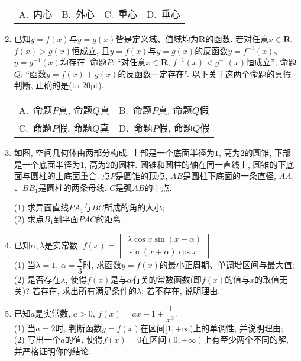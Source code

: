 \documentclass[10pt,a4paper]{article}
\newcommand{\bracket}[1]{(\hbox to #1pt{})}
\newcommand{\twoch}[4]{\par\begin{tabular}{p{.46\textwidth}p{.46\textwidth}}
A.~#1& B.~#2\\
C.~#3& D.~#4
\end{tabular}}
\newcommand{\fourch}[4]{\par\begin{tabular}{p{.23\textwidth}p{.23\textwidth}p{.23\textwidth}p{.23\textwidth}}
A.~#1 &B.~#2& C.~#3& D.~#4
\end{tabular}}
\begin{document}
\begin{enumerate}[1.]
\fourch{内心}{外心}{重心}{垂心}
\item 已知$y=f(x)$与$y=g(x)$皆是定义域、值域均为$\mathbf{R}$的函数. 若对任意$x\in \mathbf{R}$, $f(x)>g(x)$恒成立, 且$y=f(x)$与$y=g(x)$的反函数$y=f^{-1}(x)$、$y=g^{-1}(x)$均存在. 命题$P$: ``对任意$x\in \mathbf{R}$, $f^{-1}(x)<g^{-1}(x)$恒成立''; 命题$Q$: ``函数$y=f(x)+g(x)$的反函数一定存在''. 以下关于这两个命题的真假判断, 正确的是\bracket{20}.
\twoch{命题$P$真, 命题$Q$真}{命题$P$真, 命题$Q$假
}{命题$P$假, 命题$Q$真}{命题$P$假, 命题$Q$假}
\item 如图, 空间几何体由两部分构成, 上部是一个底面半径为$1$, 高为$2$的圆锥, 下部是一个底面半径为$1$, 高为$2$的圆柱. 圆锥和圆柱的轴在同一直线上, 圆锥的下底面与圆柱的上底面重合. 点$P$是圆锥的顶点, $AB$是圆柱下底面的一条直径, $AA_1$、$BB_1$是圆柱的两条母线. $C$是弧$AB$的中点.
\begin{center}
\end{center}
(1) 求异面直线$PA_1$与$BC$所成的角的大小;\\
(2) 求点$B_1$到平面$PAC$的距离.
\item 已知$\alpha,\lambda$是实常数, $f(x)=\begin{vmatrix}
    \lambda \cos x  \sin (x-\alpha)  \\\sin (x+\alpha)  \cos x  \end{vmatrix}$.\\
(1) 当$\lambda=1$, $\alpha=\dfrac{\pi}3$时, 求函数$y=f(x)$的最小正周期、单调增区间与最大值;\\
(2) 是否存在$\lambda$, 使得$f(x)$是与$\alpha$有关的常数函数(即$f(x)$的值与$x$的取值无关)? 若存在, 求出所有满足条件的$\lambda$; 若不存在, 说明理由.
\item 已知$a$是实常数, $a>0$, $f(x)=ax-1+\dfrac 1{x^2}$.\\
(1) 当$a=2$时, 判断函数$y=f(x)$在区间$[1,+\infty)$上的单调性, 并说明理由;\\
(2) 写出一个$a$的值, 使得$f(x)=0$在区间$(0,+\infty)$上有至少两个不同的解, 并严格证明你的结论.

\end{enumerate}
\end{document}
